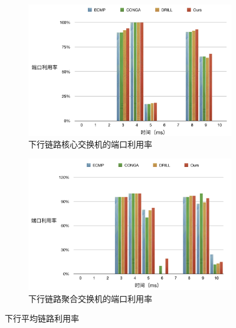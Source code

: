 \begin{figure}[htb!]
\centering
\begin{subfigure}{0.47\textwidth}
     \includegraphics[width=\textwidth]{figure/downcore.png}
     \caption{下行链路核心交换机的端口利用率}
\end{subfigure}\hspace{2em}
\begin{subfigure}{0.47\textwidth}
    \includegraphics[width=\textwidth]{figure/downagg.png}
    \caption{下行链路聚合交换机的端口利用率}

\end{subfigure}%
\caption{下行平均链路利用率}
\label{fig:downcoreagg}
\end{figure}



